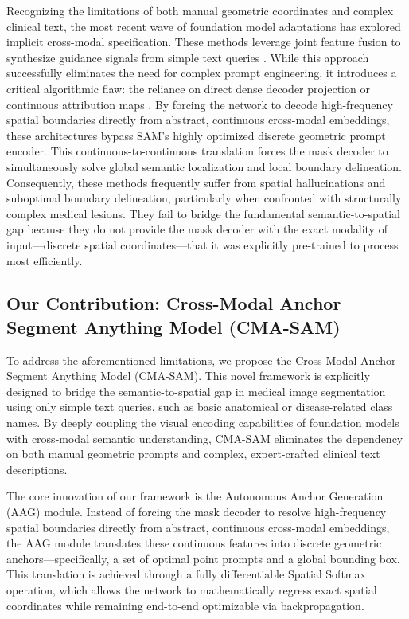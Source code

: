 \documentclass[onecolumn]{IEEEtran}
\numberwithin{equation}{section}
\theoremstyle{definition}
\theoremstyle{remark}
\begin{document}
Recognizing the limitations of both manual geometric coordinates and complex clinical text, the most recent wave of foundation model adaptations has explored implicit cross-modal specification. These methods leverage joint feature fusion to synthesize guidance signals from simple text queries \cite{qian2024simplevilmedsam, aleem2024test, wang2024sam, lan2024proxyclip}. While this approach successfully eliminates the need for complex prompt engineering, it introduces a critical algorithmic flaw: the reliance on direct dense decoder projection or continuous attribution maps \cite{wang2023visual}. By forcing the network to decode high-frequency spatial boundaries directly from abstract, continuous cross-modal embeddings, these architectures bypass SAM's highly optimized discrete geometric prompt encoder. This continuous-to-continuous translation forces the mask decoder to simultaneously solve global semantic localization and local boundary delineation. Consequently, these methods frequently suffer from spatial hallucinations and suboptimal boundary delineation, particularly when confronted with structurally complex medical lesions. They fail to bridge the fundamental semantic-to-spatial gap because they do not provide the mask decoder with the exact modality of input—discrete spatial coordinates—that it was explicitly pre-trained to process most efficiently.

\subsection{Our Contribution: Cross-Modal Anchor Segment Anything Model (CMA-SAM)}

To address the aforementioned limitations, we propose the Cross-Modal Anchor Segment Anything Model (CMA-SAM). This novel framework is explicitly designed to bridge the semantic-to-spatial gap in medical image segmentation using only simple text queries, such as basic anatomical or disease-related class names. By deeply coupling the visual encoding capabilities of foundation models with cross-modal semantic understanding, CMA-SAM eliminates the dependency on both manual geometric prompts and complex, expert-crafted clinical text descriptions.

The core innovation of our framework is the Autonomous Anchor Generation (AAG) module. Instead of forcing the mask decoder to resolve high-frequency spatial boundaries directly from abstract, continuous cross-modal embeddings, the AAG module translates these continuous features into discrete geometric anchors—specifically, a set of optimal point prompts and a global bounding box. This translation is achieved through a fully differentiable Spatial Softmax operation, which allows the network to mathematically regress exact spatial coordinates while remaining end-to-end optimizable via backpropagation.
\end{document}
